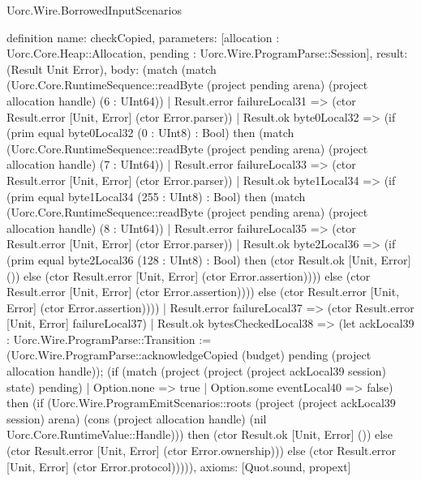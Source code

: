 \begin{lexlean}{Uorc.Wire.BorrowedInputScenarios}
\begin{semanticmodule}
definition{
  name: checkCopied,
  parameters: [allocation : Uorc.Core.Heap::Allocation, pending : Uorc.Wire.ProgramParse::Session],
  result: (Result Unit Error),
  body: (match (match (Uorc.Core.RuntimeSequence::readByte (project pending arena) (project allocation handle) (6 : UInt64))
      | Result.error failureLocal31 => (ctor Result.error [Unit, Error] (ctor Error.parser))
      | Result.ok byte0Local32 => (if (prim equal byte0Local32 (0 : UInt8) : Bool) then (match (Uorc.Core.RuntimeSequence::readByte (project pending arena) (project allocation handle) (7 : UInt64))
        | Result.error failureLocal33 => (ctor Result.error [Unit, Error] (ctor Error.parser))
        | Result.ok byte1Local34 => (if (prim equal byte1Local34 (255 : UInt8) : Bool) then (match (Uorc.Core.RuntimeSequence::readByte (project pending arena) (project allocation handle) (8 : UInt64))
          | Result.error failureLocal35 => (ctor Result.error [Unit, Error] (ctor Error.parser))
          | Result.ok byte2Local36 => (if (prim equal byte2Local36 (128 : UInt8) : Bool) then (ctor Result.ok [Unit, Error] ()) else (ctor Result.error [Unit, Error] (ctor Error.assertion)))) else (ctor Result.error [Unit, Error] (ctor Error.assertion)))) else (ctor Result.error [Unit, Error] (ctor Error.assertion))))
    | Result.error failureLocal37 => (ctor Result.error [Unit, Error] failureLocal37)
    | Result.ok bytesCheckedLocal38 => (let ackLocal39 : Uorc.Wire.ProgramParse::Transition := (Uorc.Wire.ProgramParse::acknowledgeCopied (budget) pending (project allocation handle)); (if (match (project (project (project ackLocal39 session) state) pending)
      | Option.none => true
      | Option.some eventLocal40 => false) then (if (Uorc.Wire.ProgramEmitScenarios::roots (project (project ackLocal39 session) arena) (cons (project allocation handle) (nil Uorc.Core.RuntimeValue::Handle))) then (ctor Result.ok [Unit, Error] ()) else (ctor Result.error [Unit, Error] (ctor Error.ownership))) else (ctor Result.error [Unit, Error] (ctor Error.protocol))))),
  axioms: [Quot.sound, propext]
}


\end{semanticmodule}
\end{lexlean}
